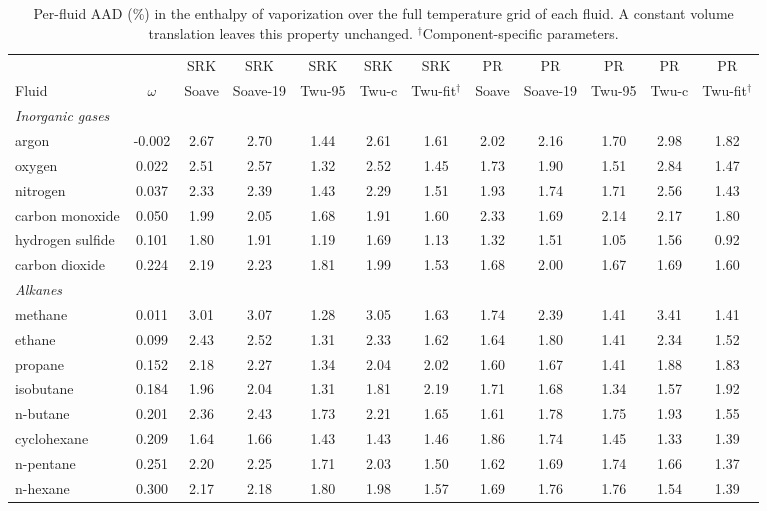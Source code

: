 \begin{table}[H]
\centering
\caption{Per-fluid AAD (\%) in the enthalpy of vaporization over the full temperature grid of each fluid. A constant volume translation leaves this property unchanged. $^{\dagger}$Component-specific parameters.}
\label{tab:tabS_perfluid_hvap}
\small
\begin{tabular}{lccccccccccc}
\toprule
 &  & SRK & SRK & SRK & SRK & SRK & PR & PR & PR & PR & PR \\
Fluid & $\omega$ & Soave & Soave-19 & Twu-95 & Twu-c & Twu-fit$^{\dagger}$ & Soave & Soave-19 & Twu-95 & Twu-c & Twu-fit$^{\dagger}$ \\
\midrule
\multicolumn{15}{l}{\emph{Inorganic gases}} \\
argon & -0.002 & 2.67 & 2.70 & 1.44 & 2.61 & 1.61 & 2.02 & 2.16 & 1.70 & 2.98 & 1.82 \\
oxygen & 0.022 & 2.51 & 2.57 & 1.32 & 2.52 & 1.45 & 1.73 & 1.90 & 1.51 & 2.84 & 1.47 \\
nitrogen & 0.037 & 2.33 & 2.39 & 1.43 & 2.29 & 1.51 & 1.93 & 1.74 & 1.71 & 2.56 & 1.43 \\
carbon monoxide & 0.050 & 1.99 & 2.05 & 1.68 & 1.91 & 1.60 & 2.33 & 1.69 & 2.14 & 2.17 & 1.80 \\
hydrogen sulfide & 0.101 & 1.80 & 1.91 & 1.19 & 1.69 & 1.13 & 1.32 & 1.51 & 1.05 & 1.56 & 0.92 \\
carbon dioxide & 0.224 & 2.19 & 2.23 & 1.81 & 1.99 & 1.53 & 1.68 & 2.00 & 1.67 & 1.69 & 1.60 \\
\multicolumn{15}{l}{\emph{Alkanes}} \\
methane & 0.011 & 3.01 & 3.07 & 1.28 & 3.05 & 1.63 & 1.74 & 2.39 & 1.41 & 3.41 & 1.41 \\
ethane & 0.099 & 2.43 & 2.52 & 1.31 & 2.33 & 1.62 & 1.64 & 1.80 & 1.41 & 2.34 & 1.52 \\
propane & 0.152 & 2.18 & 2.27 & 1.34 & 2.04 & 2.02 & 1.60 & 1.67 & 1.41 & 1.88 & 1.83 \\
isobutane & 0.184 & 1.96 & 2.04 & 1.31 & 1.81 & 2.19 & 1.71 & 1.68 & 1.34 & 1.57 & 1.92 \\
n-butane & 0.201 & 2.36 & 2.43 & 1.73 & 2.21 & 1.65 & 1.61 & 1.78 & 1.75 & 1.93 & 1.55 \\
cyclohexane & 0.209 & 1.64 & 1.66 & 1.43 & 1.43 & 1.46 & 1.86 & 1.74 & 1.45 & 1.33 & 1.39 \\
n-pentane & 0.251 & 2.20 & 2.25 & 1.71 & 2.03 & 1.50 & 1.62 & 1.69 & 1.74 & 1.66 & 1.37 \\
n-hexane & 0.300 & 2.17 & 2.18 & 1.80 & 1.98 & 1.57 & 1.69 & 1.76 & 1.76 & 1.54 & 1.39 \\

\end{tabular}
\end{table}
